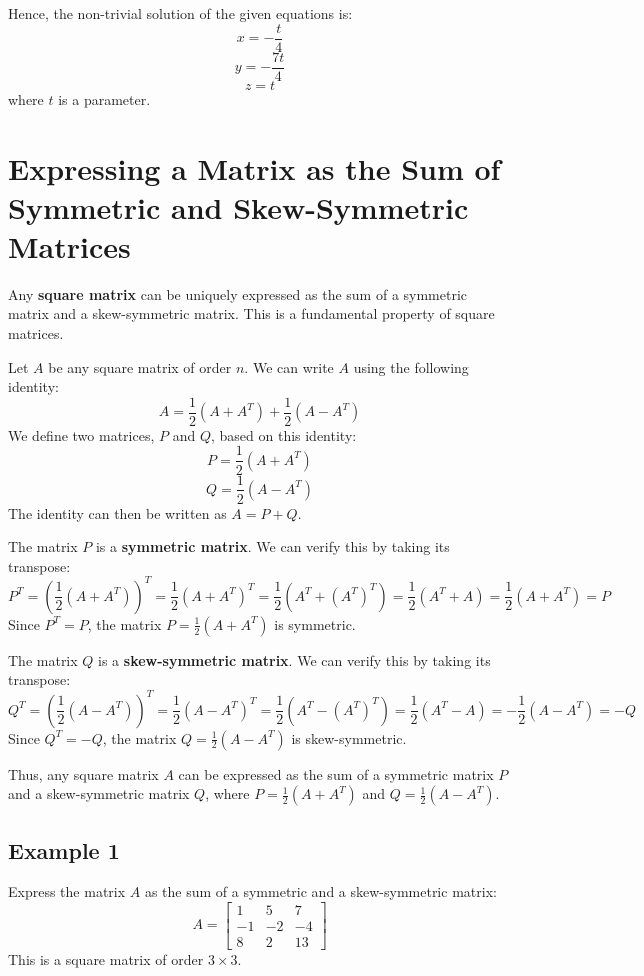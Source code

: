 \documentclass{article}
\begin{document}
Hence, the non-trivial solution of the given equations is:
\[ x = -\frac{t}{4} \]
\[ y = -\frac{7t}{4} \]
\[ z = t \]
where $t$ is a parameter.

\section{Expressing a Matrix as the Sum of Symmetric and Skew-Symmetric Matrices} %

Any \textbf{square matrix} can be uniquely expressed as the sum of a symmetric matrix and a skew-symmetric matrix. This is a fundamental property of square matrices.

Let $A$ be any square matrix of order $n$. We can write $A$ using the following identity:
\[ A = \frac{1}{2}(A + A^T) + \frac{1}{2}(A - A^T) \]
We define two matrices, $P$ and $Q$, based on this identity:
\[ P = \frac{1}{2}(A + A^T) \]
\[ Q = \frac{1}{2}(A - A^T) \]
The identity can then be written as $A = P + Q$.

The matrix $P$ is a \textbf{symmetric matrix}. We can verify this by taking its transpose:
\[ P^T = \left( \frac{1}{2}(A + A^T) \right)^T = \frac{1}{2}(A + A^T)^T = \frac{1}{2}(A^T + (A^T)^T) = \frac{1}{2}(A^T + A) = \frac{1}{2}(A + A^T) = P \]
Since $P^T = P$, the matrix $P = \frac{1}{2}(A + A^T)$ is symmetric.

The matrix $Q$ is a \textbf{skew-symmetric matrix}. We can verify this by taking its transpose:
\[ Q^T = \left( \frac{1}{2}(A - A^T) \right)^T = \frac{1}{2}(A - A^T)^T = \frac{1}{2}(A^T - (A^T)^T) = \frac{1}{2}(A^T - A) = -\frac{1}{2}(A - A^T) = -Q \]
Since $Q^T = -Q$, the matrix $Q = \frac{1}{2}(A - A^T)$ is skew-symmetric.

Thus, any square matrix $A$ can be expressed as the sum of a symmetric matrix $P$ and a skew-symmetric matrix $Q$, where $P = \frac{1}{2}(A + A^T)$ and $Q = \frac{1}{2}(A - A^T)$.

\subsection{Example 1} %
Express the matrix $A$ as the sum of a symmetric and a skew-symmetric matrix:
\[ A = \begin{bmatrix} 1 & 5 & 7 \\ -1 & -2 & -4 \\ 8 & 2 & 13 \end{bmatrix} \]
This is a square matrix of order $3 \times 3$.
\end{document}
